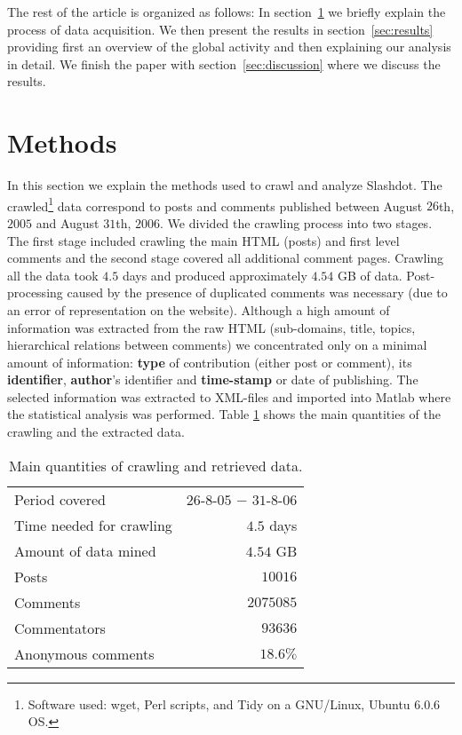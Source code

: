 \documentclass[twoside,11pt]{article}
\begin{document}
The rest of the article is organized as follows: In
section~\ref{sec:methods} we briefly explain the process of data
acquisition.  We then present the results in section~\ref{sec:results}
providing first an overview of the global activity and then explaining
our analysis in detail.  We finish the paper with
section~\ref{sec:discussion} where we discuss the results.

\section{Methods}
\label{sec:methods}\noindent
In this section we explain the methods used to crawl and analyze
Slashdot.  The crawled\footnote{Software used: wget, Perl scripts, and
  Tidy on a GNU/Linux, Ubuntu 6.0.6 OS.}  data correspond to posts and
comments published between August $26$th, $2005$ and August $31$th,
$2006$.  We divided the crawling process into two stages.  The first
stage included crawling the main HTML (posts) and first level comments
and the second stage covered all additional comment pages.  Crawling
all the data took $4.5$ days and produced approximately $4.54$ GB of
data.  Post-processing caused by the presence of duplicated comments
was necessary (due to an error of representation on the website).
Although a high amount of information was extracted from the raw HTML
(sub-domains, title, topics, hierarchical relations between comments)
we concentrated only on a minimal amount of information: \textbf{type}
of contribution (either post or comment), its \textbf{identifier},
\textbf{author}'s identifier and \textbf{time-stamp} or date of
publishing.  The selected information was extracted to XML-files and
imported into Matlab where the statistical analysis was performed.
Table \ref{table:main} shows the main quantities of the crawling and
the extracted data.  \vspace{-12pt}
\begin{table}[!hb]
\centering
\caption{Main quantities of crawling and retrieved data. \vspace{6pt}}
\begin{tabular}{lr}
  Period covered            & $26$-$8$-$05$ $-$ $31$-$8$-$06$\\
  Time needed for crawling   & $4.5$ days\\
  Amount of data mined       & $4.54$ GB\\ 
  Posts                 & $10016$ \\ 
  Comments              & $2075085$ \\ 
Commentators          & $93636$ \\ 
  Anonymous comments         & $18.6\%$
\end{tabular}
\label{table:main}
\end{table}
\end{document}
